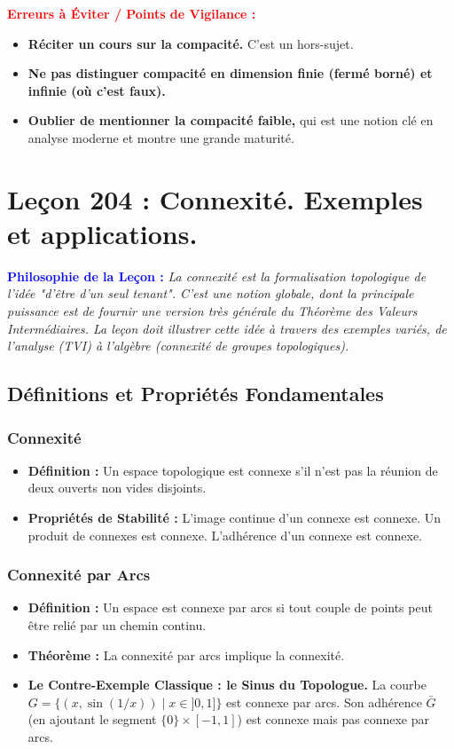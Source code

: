 \documentclass[12pt, a4paper, parskip=full]{report}
\theoremstyle{agregstyle}
\newenvironment{philosophie}
  {\par\medskip\noindent\begin{oframed}\noindent\textbf{\textcolor{blue}{Philosophie de la Leçon :}}\itshape}
  {\end{oframed}\par\medskip}
\newenvironment{erreurs}
  {\par\medskip\noindent\begin{oframed}\noindent\textbf{\textcolor{red}{Erreurs à Éviter / Points de Vigilance :}}}
  {\end{oframed}\par\medskip}
\begin{document}
\begin{erreurs}
    \begin{itemize}
        \item \textbf{Réciter un cours sur la compacité.} C'est un hors-sujet.
        \item \textbf{Ne pas distinguer compacité en dimension finie (fermé borné) et infinie (où c'est faux).}
        \item \textbf{Oublier de mentionner la compacité faible,} qui est une notion clé en analyse moderne et montre une grande maturité.
    \end{itemize}
\end{erreurs}
\chapter{Leçon 204 : Connexité. Exemples et applications.}

\begin{philosophie}
    La connexité est la formalisation topologique de l'idée "d'être d'un seul tenant". C'est une notion globale, dont la principale puissance est de fournir une version très générale du Théorème des Valeurs Intermédiaires. La leçon doit illustrer cette idée à travers des exemples variés, de l'analyse (TVI) à l'algèbre (connexité de groupes topologiques).
\end{philosophie}

\section{Définitions et Propriétés Fondamentales}

\subsection{Connexité}
\begin{itemize}
    \item \textbf{Définition :} Un espace topologique est connexe s'il n'est pas la réunion de deux ouverts non vides disjoints.
    \item \textbf{Propriétés de Stabilité :} L'image continue d'un connexe est connexe. Un produit de connexes est connexe. L'adhérence d'un connexe est connexe.
\end{itemize}

\subsection{Connexité par Arcs}
\begin{itemize}
    \item \textbf{Définition :} Un espace est connexe par arcs si tout couple de points peut être relié par un chemin continu.
    \item \textbf{Théorème :} La connexité par arcs implique la connexité.
    \item \textbf{Le Contre-Exemple Classique : le Sinus du Topologue.} La courbe $G = \{ (x, \sin(1/x)) \mid x \in ]0,1] \}$ est connexe par arcs. Son adhérence $\bar{G}$ (en ajoutant le segment $\{0\} \times [-1,1]$) est connexe mais pas connexe par arcs.
\end{itemize}
\end{document}
